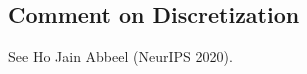 \subsection{Comment on Discretization}
See Ho Jain Abbeel (NeurIPS 2020).
































